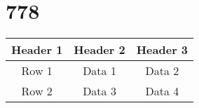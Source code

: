 \chapter{778}





\begin{table}[htb]
    \centering
        \begin{tabular}{c|c|c}
            \toprule
                 Header 1 & Header 2 & Header 3 \\
            \midrule
                Row 1    & Data 1   & Data 2   \\
                Row 2    & Data 3   & Data 4   \\
            \bottomrule
    \end{tabular}
\end{table}